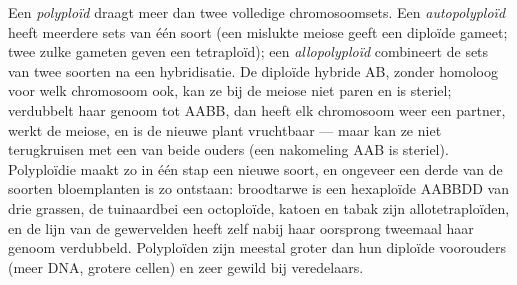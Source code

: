 \begin{definition}[Polyploïdie]\label{def:b2:genome-diversification:polyploidy}
Een \emph{polyploïd} draagt meer dan twee volledige chromosoomsets.
Een \emph{autopolyploïd} heeft meerdere sets van één soort (een mislukte
meiose geeft een diploïde gameet; twee zulke gameten geven een
tetraploïd); een \emph{allopolyploïd} combineert de sets van twee
soorten na een hybridisatie. De diploïde hybride AB, zonder homoloog voor
welk chromosoom ook, kan ze bij de meiose niet paren en is steriel;
verdubbelt haar genoom tot AABB, dan heeft elk chromosoom weer een
partner, werkt de meiose, en is de nieuwe plant vruchtbaar --- maar kan
ze niet terugkruisen met een van beide ouders (een nakomeling AAB is
steriel). Polyploïdie maakt zo in één stap een nieuwe soort, en ongeveer
een derde van de soorten bloemplanten is zo ontstaan: broodtarwe is een
hexaploïde AABBDD van drie grassen, de tuinaardbei een octoploïde,
katoen en tabak zijn allotetraploïden, en de lijn van de gewervelden
heeft zelf nabij haar oorsprong tweemaal haar genoom verdubbeld.
Polyploïden zijn meestal groter dan hun diploïde voorouders (meer DNA,
grotere cellen) en zeer gewild bij veredelaars.
\end{definition}

